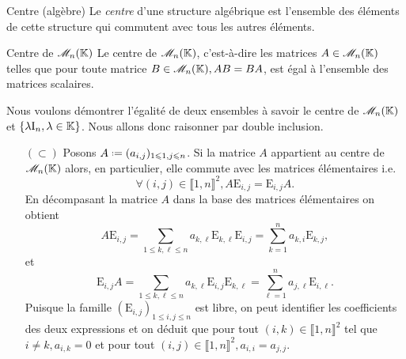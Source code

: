 \begin{defi}{Centre (algèbre)}
    Le \emph{centre} d'une structure algébrique est l'ensemble des éléments de cette structure qui commutent avec tous les autres éléments. 
\end{defi}

\begin{prop}{Centre de $\mathscr{M}_n(\mathbb{K})$}
Le centre de $\mathscr{M}_n(\mathbb{K})$, c'est-à-dire les matrices $A \in \mathscr{M}_n(\mathbb{K})$ telles que pour toute matrice $B \in \mathscr{M}_n(\mathbb{K}), AB = BA$, est égal à l'ensemble des matrices scalaires.
\end{prop}

Nous voulons démontrer l'égalité de deux ensembles à savoir le centre de $\mathscr{M}_n(\mathbb{K})$ et $\{ \lambda \mathrm{I}_n, \lambda \in \mathbb{K} \}$. Nous allons donc raisonner par double inclusion. 
\begin{preuve}
    \begin{itemize}
        \item[$(\subset)$] Posons $A \defeq (a_{i,j})_{1 \leqslant 1, j \leqslant n}$. Si la matrice $A$ appartient au centre de $\mathscr{M}_n(\mathbb{K})$ alors, en particulier, elle commute avec les matrices élémentaires \note i.e. 
        $$\forall (i, j) \in \llbracket 1, n \rrbracket^2, A \mathrm{E}_{i,j} = \mathrm{E}_{i,j} A.$$
        En décompasant la matrice $A$ dans la base des matrices élémentaires on obtient
        $$A \mathrm{E}_{i,j} = \sum_{1 \leqslant k, \ell \leqslant n} a_{k, \ell} \mathrm{E}_{k,\ell} \mathrm{E}_{i,j} = \sum_{k=1}^{n} a_{k,i} \mathrm{E}_{k,j},$$
        et
        $$\mathrm{E}_{i,j} A = \sum_{1 \leqslant k, \ell \leqslant n} a_{k, \ell} \mathrm{E}_{i,j} \mathrm{E}_{k,\ell} = \sum_{\ell=1}^{n} a_{j,\ell} \mathrm{E}_{i,\ell}.$$
        Puisque la famille $(\mathrm{E}_{i, j})_{1 \leqslant i, j \leqslant n}$ est libre, on peut identifier les coefficients des deux expressions et on déduit que pour tout $(i, k) \in \llbracket 1, n \rrbracket^2$ tel que $i \not= k, a_{i,k}=0$ et pour tout $(i,j) \in \llbracket 1, n \rrbracket^2, a_{i,i}=a_{j,j}$. \\

\end{itemize}
\end{preuve}
